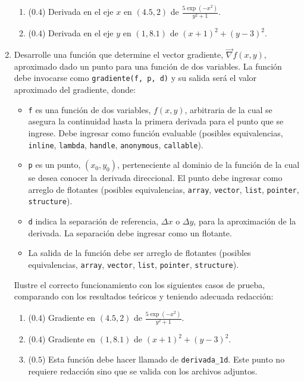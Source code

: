 \documentclass[12pt]{article}
\begin{document}
\begin{enumerate}[leftmargin=*,widest=9]
   \begin{enumerate}[label=\alph*]
    \item ($0.4$) Derivada en el eje \(x\) en \((4.5, 2)\) de {\large \(\frac{5\exp(-x^2)}{y^2+1}\)}.
    \item ($0.4$) Derivada en el eje \(y\) en \((1, 8.1)\) de \((x+1)^2 + (y-3)^2\).
   \end{enumerate}


    \item Desarrolle una función que determine el vector gradiente, \(\vec{\nabla} f(x,y)\), aproximado dado un punto para una función de dos variables. La función debe invocarse como \verb-gradiente(f, p, d)- y su salida será el valor aproximado del gradiente, donde:

      \begin{itemize}
        \item \verb-f- es una función de dos variables, \(f(x,y)\), arbitraria de la cual se asegura la continuidad hasta la primera derivada para el punto que se ingrese. Debe ingresar como función evaluable (posibles equivalencias, \verb-inline-, \verb-lambda-, \verb-handle-, \verb-anonymous-, \verb-callable-).
    \item \verb-p- es un punto, \((x_0,y_0)\), perteneciente al dominio de la función de la cual se desea conocer la derivada direccional. El punto debe ingresar como arreglo de flotantes (posibles equivalencias, \verb-array-, \verb-vector-, \verb-list-, \verb-pointer-, \verb-structure-).
    \item \verb-d- indica la separación de referencia, \(\Delta x\) o \(\Delta y\), para la aproximación de la derivada. La separación debe ingresar como un flotante.
    \item La salida de la función debe ser arreglo de flotantes (posibles equivalencias, \verb-array-, \verb-vector-, \verb-list-, \verb-pointer-, \verb-structure-).
    \end{itemize}

    Ilustre el correcto funcionamiento con los siguientes casos de prueba, comparando con los resultados teóricos y teniendo adecuada redacción:

   \begin{enumerate}[label=\alph*]
    \item ($0.4$) Gradiente en \((4.5, 2)\) de {\large \(\frac{5\exp(-x^2)}{y^2+1}\)}.
    \item ($0.4$) Gradiente en \((1, 8.1)\) de \((x+1)^2 + (y-3)^2\).
    \item ($0.5$) Esta función debe hacer llamado de \verb-derivada_1d-. Este punto no requiere redacción sino que se valida con los archivos adjuntos.
   \end{enumerate}



\end{enumerate}
\end{document}
